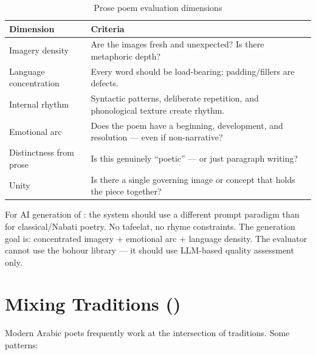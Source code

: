 \begin{table}[H]
\centering
\caption{Prose poem evaluation dimensions}
\renewcommand{\arraystretch}{1.5}
\begin{tabularx}{\textwidth}{lX}
\toprule
\textbf{Dimension} & \textbf{Criteria} \\
\midrule
Imagery density & Are the images fresh and unexpected? Is there metaphoric depth? \\
Language concentration & Every word should be load-bearing; padding/fillers are defects. \\
Internal rhythm & Syntactic patterns, deliberate repetition, and phonological texture create rhythm. \\
Emotional arc & Does the poem have a beginning, development, and resolution — even if non-narrative? \\
Distinctness from prose & Is this genuinely ``poetic'' — or just paragraph writing? \\
Unity & Is there a single governing image or concept that holds the piece together? \\
\bottomrule
\end{tabularx}
\end{table}

\begin{implnote}
For AI generation of : the system should use a different prompt paradigm than for classical/Nabati poetry. No tafeelat, no rhyme constraints. The generation goal is: concentrated imagery + emotional arc + language density. The evaluator cannot use the bohour library — it should use LLM-based quality assessment only.
\end{implnote}

\section{Mixing Traditions ()}
\label{sec:mixing}

Modern Arabic poets frequently work at the intersection of traditions. Some patterns:

